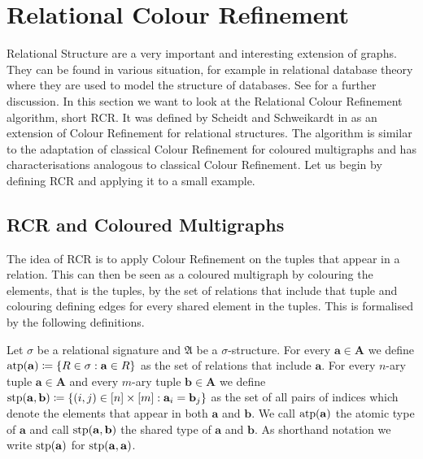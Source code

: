 \section{Relational Colour Refinement}
\label{sec:RelationalColourRefinement}

Relational Structure are a very important and interesting extension of graphs.
They can be found in various situation, for example in relational database theory where they are used to model the structure of databases.
See \cite{abiteboul1996FoundationsDatabases} for a further discussion.
In this section we want to look at the Relational Colour Refinement algorithm, short RCR. 
It was defined by Scheidt and Schweikardt in \cite{scheidt2025ColorRefinement} as an extension of Colour Refinement for relational structures.
The algorithm is similar to the adaptation of classical Colour Refinement for coloured multigraphs and has characterisations analogous to classical Colour Refinement.
Let us begin by defining RCR and applying it to a small example.

\subsection{RCR and Coloured Multigraphs}

The idea of RCR is to apply Colour Refinement on the tuples that appear in a relation.
This can then be seen as a coloured multigraph by colouring the elements, that is the tuples, by the set of relations that include that tuple and colouring defining edges for every shared element in the tuples.
This is formalised by the following definitions.

\begin{definition}
	Let $\sigma$ be a relational signature and $\mathfrak A$ be a $\sigma$-structure.
	For every $\mathbf a \in \mathbf A$ we define $\operatorname{atp}(\mathbf a)\coloneqq \{R \in \sigma : \mathbf a\in R\}$ as the set of relations that include $\mathbf a$.
	For every $n$-ary tuple $\mathbf a\in \mathbf A$ and every $m$-ary tuple $\mathbf b\in \mathbf A$ we define $\operatorname{stp}(\mathbf a, \mathbf b)\coloneqq\{(i, j) \in [n]\times [m] : \mathbf a_i=\mathbf b_j\}$ as the set of all pairs of indices which denote the elements that appear in both $\mathbf a$ and $\mathbf b$.
	We call $\operatorname{atp}(\mathbf a)$ the atomic type of $\mathbf a$ and call $\operatorname{stp}(\mathbf a,\mathbf b)$ the shared type of $\mathbf a$ and $\mathbf b$.
	As shorthand notation we write $\operatorname{stp}(\mathbf a)$ for $\operatorname{stp}(\mathbf a, \mathbf a)$.
\end{definition}


